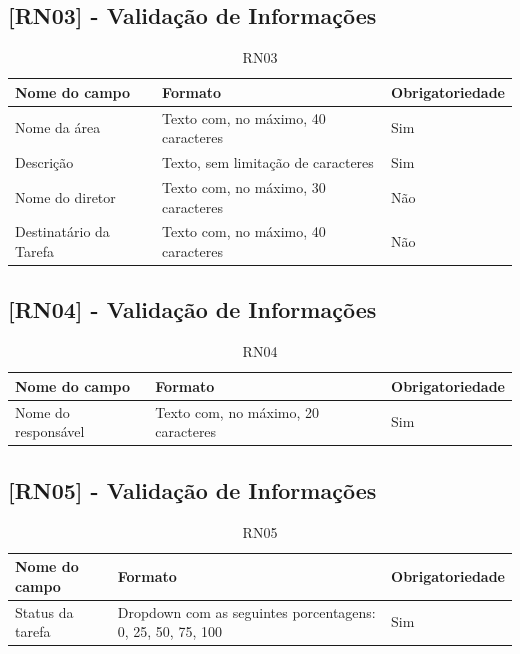 \begin{apendicesenv}
\subsection{[RN03] - Validação de Informações}

\begin{table}[!h]
\centering
\caption{RN03}
\label{RN03}
\begin{tabular}{|p{4cm}|p{8cm}|p{3cm}|}
\hline
Nome do campo          & Formato                             & Obrigatoriedade \\ \hline
Nome da área           & Texto com, no máximo, 40 caracteres & Sim             \\ \hline
Descrição              & Texto, sem limitação de caracteres  & Sim             \\ \hline
Nome do diretor        & Texto com, no máximo, 30 caracteres & Não             \\ \hline
Destinatário da Tarefa & Texto com, no máximo, 40 caracteres & Não             \\ \hline
\end{tabular}
\end{table}


\subsection{[RN04] - Validação de Informações}

\begin{table}[!h]
\centering
\caption{RN04}
\label{RN04}
\begin{tabular}{|p{4cm}|p{8cm}|p{3cm}|}
\hline
Nome do campo          & Formato                             & Obrigatoriedade \\ \hline
Nome do responsável    & Texto com, no máximo, 20 caracteres & Sim             \\ \hline
\end{tabular}
\end{table}


\subsection{[RN05] - Validação de Informações}

\begin{table}[!h]
\centering
\caption{RN05}
\label{RN05}
\begin{tabular}{|p{4cm}|p{8cm}|p{3cm}|}
\hline
Nome do campo          & Formato                                                    & Obrigatoriedade \\ \hline
Status da tarefa       & Dropdown com as seguintes porcentagens: 0, 25, 50, 75, 100 & Sim             \\ \hline
\end{tabular}
\end{table}













\end{apendicesenv}

